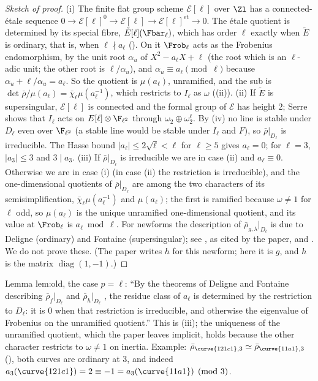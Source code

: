 \begin{proof}[Sketch of proof]
(i) The finite flat group scheme $\mathcal E[\ell]$ over $\Zl$ has a connected-\'etale sequence $0\to\mathcal E[\ell]^0\to\mathcal E[\ell]\to\mathcal E[\ell]^{\mathrm{et}}\to0$. The
\'etale quotient is determined by its special fibre, $\tilde E[\ell](\Fbar_\ell)$, which has order $\ell$ exactly when $\tilde E$ is ordinary, that is, when
$\ell\nmid a_\ell$ (). On it $\Frob_\ell$ acts as the Frobenius endomorphism, by the unit root $\alpha_u$ of $X^2-a_\ell X+\ell$ (the root which is
an $\ell$-adic unit; the other root is $\ell/\alpha_u$), and $\alpha_u\equiv a_\ell\pmod\ell$ because $\alpha_u+\ell/\alpha_u=a_\ell$. So the quotient is $\mu(a_\ell)$, unramified, and the
sub is $\det\bar\rho/\mu(a_\ell)=\bar\chi_\ell\mu(a_\ell^{-1})$, which restricts to $I_\ell$ as $\omega$ ((ii)). (ii) If $\tilde E$ is
supersingular, $\mathcal E[\ell]$ is connected and the formal group of $\mathcal E$ has height $2$; Serre \cite[Section 1]{Serre72} shows that $I_\ell$ acts on
$E[\ell]\otimes\F_{\ell^2}$ through $\omega_2\oplus\omega_2^\ell$. By (iv) no line is stable under $D_\ell$ even over $\F_{\ell^2}$ (a
stable line would be stable under $I_\ell$ and $F$), so $\bar\rho|_{D_\ell}$ is irreducible. The Hasse bound $|a_\ell|\le2\sqrt\ell<\ell$ for $\ell\ge5$ gives $a_\ell=0$; for
$\ell=3$, $|a_3|\le3$ and $3\mid a_3$. (iii) If $\bar\rho|_{D_\ell}$ is irreducible we are in case (ii) and $a_\ell\equiv0$. Otherwise we are in case (i) (in case (ii)
the restriction is irreducible), and the one-dimensional quotients of $\bar\rho|_{D_\ell}$ are among the two characters of its semisimplification,
$\bar\chi_\ell\mu(a_\ell^{-1})$ and $\mu(a_\ell)$; the first is ramified because $\omega\ne1$ for $\ell$ odd, so $\mu(a_\ell)$ is the unique unramified one-dimensional
quotient, and its value at $\Frob_\ell$ is $a_\ell\bmod\ell$. For newforms the description of $\bar\rho_{g,\lambda}|_{D_\ell}$ is due to Deligne (ordinary) and Fontaine
(supersingular); see \cite[Section 2]{Edixhoven92}, as cited by the paper, and . We do not prove these. (The paper writes $h$ for this
newform; here it is $g$, and $h$ is the matrix $\operatorname{diag}(1,-1)$.)
\end{proof}

\begin{paperlink}
Lemma lem:old, the case $p=\ell$: ``By the theorems of Deligne and Fontaine describing $\bar\rho_f|_{D_\ell}$ and $\bar\rho_h|_{D_\ell}$
\cite[\S2]{Edixhoven92}, the residue class of $a_\ell$ is determined by the restriction to $D_\ell$: it is $0$ when that restriction is irreducible,
and otherwise the eigenvalue of Frobenius on the unramified quotient.'' This is (iii); the uniqueness of the
unramified quotient, which the paper leaves implicit, holds because the other character restricts to $\omega\ne1$ on inertia. Example:
$\bar\rho_{\curve{121c1},3}\simeq\bar\rho_{\curve{11a1},3}$ (), both curves are ordinary at $3$, and indeed
$a_3(\curve{121c1})=2\equiv-1=a_3(\curve{11a1})\pmod3$.
\end{paperlink}

